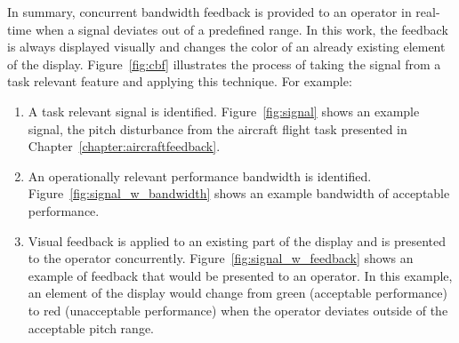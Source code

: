 In summary, concurrent bandwidth feedback is provided to an operator in real-time when a signal deviates out of a predefined range.
In this work, the feedback is always displayed visually and changes the color of an already existing element of the display.
Figure~\ref{fig:cbf} illustrates the process of taking the signal from a task relevant feature and applying this technique.
For example:
\begin{enumerate}
    \item A task relevant signal is identified.
          Figure~\ref{fig:signal} shows an example signal, the pitch disturbance from the aircraft flight task presented in Chapter~\ref{chapter:aircraftfeedback}.
    \item An operationally relevant performance bandwidth is identified.
          Figure~\ref{fig:signal_w_bandwidth} shows an example bandwidth of acceptable performance.
    \item Visual feedback is applied to an existing part of the display and is presented to the operator concurrently.
          Figure~\ref{fig:signal_w_feedback} shows an example of feedback that would be presented to an operator.
          In this example, an element of the display would change from green (acceptable performance) to red (unacceptable performance) when the operator deviates outside of the acceptable pitch range.
\end{enumerate}

